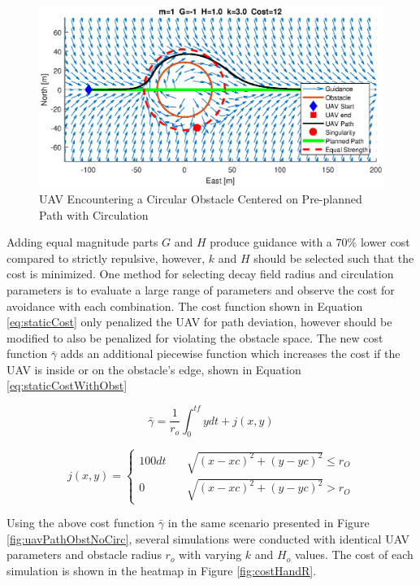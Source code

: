 \documentclass[numbered,pdftex]{ohio-etd}
\begin{document}
\begin{figure}[H]
	\centering
	\includegraphics[trim=0 85 0 85,clip,width=15cm]{PaperFigures/Methods/bruteForceSolvedN1V10WithCirc}
	\caption{UAV Encountering a Circular Obstacle Centered on Pre-planned Path with Circulation}
	\label{fig:uavPathObstWithCirc}
\end{figure}

Adding equal magnitude parts $G$ and $H$ produce guidance with a $70 \%$ lower cost compared to strictly repulsive, however, $k$ and $H$ should be selected such that the cost is minimized. One method for selecting decay field radius and circulation parameters is to evaluate a large range of parameters and observe the cost for avoidance with each combination. The cost function shown in Equation \ref{eq:staticCost} only penalized the UAV for path deviation, however should be modified to also be penalized for violating the obstacle space. The new cost function $\bar{\gamma}$ adds an additional piecewise function which increases the cost if the UAV is inside or on the obstacle's edge, shown in Equation \ref{eq:staticCostWithObst}


 \begin{equation}
\label{eq:staticCostWithObst}
\bar{\gamma} = \frac{1}{r_o}\int_{0}^{tf}ydt + j(x,y)
\end{equation}

\begin{equation}
j(x,y) = \left\{
\begin{array}{ll}
100dt & \quad \sqrt{(x-xc)^2+(y-yc)^2} \leq r_O \\
0 & \quad \sqrt{ (x-xc)^2+(y-yc)^2 } > r_O
\end{array}
\right.
\end{equation}


Using the above cost function $\bar{\gamma}$ in the same scenario presented in Figure \ref{fig:uavPathObstNoCirc}, several simulations were conducted with identical UAV parameters and obstacle radius $r_o$ with varying $k$ and $H_o$ values. The cost of each simulation is shown in the heatmap in Figure \ref{fig:costHandR}. 
\end{document}
